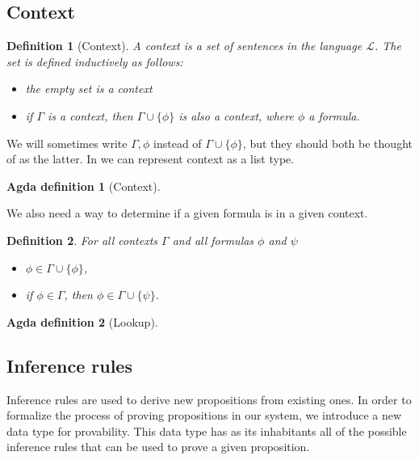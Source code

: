 \documentclass[titlepage]{article}
\newtheorem{definition}{Definition}[section]
\newtheorem{agdadef}{Agda definition}
\begin{document}

\subsection{Context}
\begin{definition}[Context]
    A context is a set of sentences in the language $\mathcal{L}$. The set is defined inductively as follows:
    \begin{itemize}
        \item the empty set is a context
        \item if $\Gamma$ is a context, then $\Gamma \cup \{\phi\}$ is also a context, where $\phi$ a formula.
    \end{itemize}
\end{definition}
We will sometimes write $\Gamma, \phi$ instead of $\Gamma \cup \{\phi\}$, but they should both be thought of as the latter. In \Agda we can represent context as a list type.

\begin{agdadef}[Context]$ $
\end{agdadef}
We also need a way to determine if a given formula is in a given context. 
\begin{definition}\label{lookup}
    For all contexts $\Gamma$ and all formulas $\phi$ and $\psi$
    \begin{itemize}
        \item $\phi \in \Gamma \cup \{\phi\}$,
        \item if $\phi \in \Gamma$, then $\phi \in \Gamma \cup \{\psi\}$.
    \end{itemize}
\end{definition}

\begin{agdadef}[Lookup]$ $
\end{agdadef}



\subsection{Inference rules}

Inference rules are used to derive new propositions from existing ones. In order to formalize the process of proving propositions in our system, we introduce a new data type for provability. This data type has as its inhabitants all of the possible inference rules that can be used to prove a given proposition.
\end{document}
